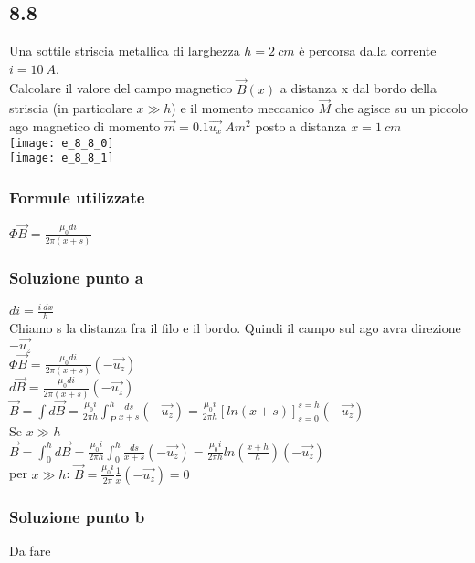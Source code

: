 \documentclass[../../main.tex]{subfiles}
\begin{document}
\subsection*{8.8}
Una sottile striscia metallica di larghezza $h = 2\ cm$ è percorsa dalla corrente $i = 10\ A$.\\
Calcolare il valore del campo magnetico $\vec{B}(x)$ a distanza x dal bordo della striscia (in particolare $x\gg h$) e il momento meccanico $\vec{M}$ che agisce su un piccolo ago magnetico di momento $\vec{m} = 0.1\vec{u_x}\ Am^2$ posto a distanza $x = 1\ cm$
\\\texttt{[image: e\_8\_8\_0]}
\\\texttt{[image: e\_8\_8\_1]}
\subsubsection*{Formule utilizzate}
$\Phi\vec{B} = \frac{\mu_0di}{2\pi(x+s)}$
\subsubsection*{Soluzione punto a}
$di = \frac{i\ dx}{h}$\\
Chiamo s la distanza fra il filo e il bordo.
Quindi il campo sul ago avra direzione $-\vec{u_z}$\\
$\Phi\vec{B} = \frac{\mu_0di}{2\pi(x+s)} (-\vec{u_z})$\\
$d\vec{B} = \frac{\mu_0di}{2\pi (x+s)}(-\vec{u_z})$\\
$\vec{B} = \int d\vec{B} = \frac{\mu_0i}{2\pi h}\int_P^h\frac{ds}{x+s}(-\vec{u_z}) = \frac{\mu_0i}{2\pi h}\left[ln(x+s)\right]_{s=0}^{s=h}(-\vec{u_z})$\\
Se $x \gg h$\\
$\vec{B} = \int_0^h d\vec{B} = \frac{\mu_0i}{2\pi h}\int_0^h\frac{ds}{x+s}(-\vec{u_z}) = \frac{\mu_0i}{2\pi h}ln\left(\frac{x+h}{h}\right)(-\vec{u_z})$\\
per $x \gg h$: $\vec{B} = \frac{\mu_0i}{2\pi} \frac{1}{x}(-\vec{u_z}) = 0$
\subsubsection*{Soluzione punto b}
Da fare
\newpage
\end{document}
